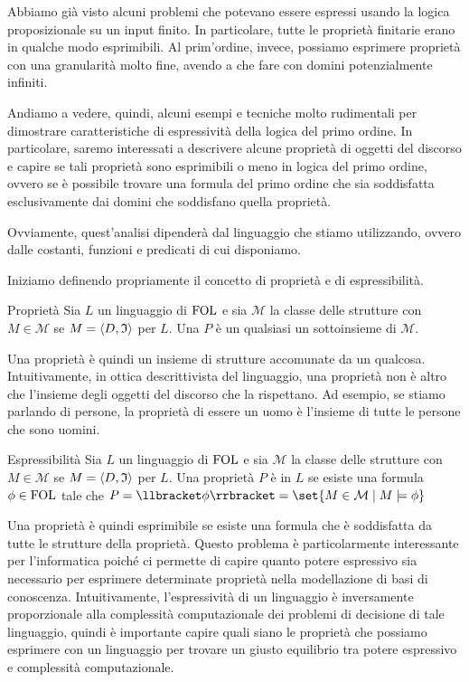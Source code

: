 Abbiamo già visto alcuni problemi che potevano essere espressi usando la logica proposizionale su un input finito. In particolare, tutte le proprietà finitarie erano in qualche modo esprimibili. Al prim'ordine, invece, possiamo esprimere proprietà con una granularità molto fine, avendo a che fare con domini potenzialmente infiniti. 

Andiamo a vedere, quindi, alcuni esempi e tecniche molto rudimentali per dimostrare caratteristiche di espressività della logica del primo ordine. In particolare, saremo interessati a descrivere alcune proprietà di oggetti del discorso e capire se tali proprietà sono esprimibili o meno in logica del primo ordine, ovvero se è possibile trovare una formula del primo ordine che sia soddisfatta esclusivamente dai domini che soddisfano quella proprietà.

Ovviamente, quest'analisi dipenderà dal linguaggio che stiamo utilizzando, ovvero dalle costanti, funzioni e predicati di cui disponiamo. 

Iniziamo definendo propriamente il concetto di proprietà e di espressibilità.

\begin{definition}{Proprietà}
  Sia \(L\) un linguaggio di \(\FOL\) e sia \(\mathcal{M}\) la classe delle strutture con \(M \in \mathcal{M}\) se \(M = \langle D,\mathfrak{I}\rangle\) per \(L\). Una  \(P\) è un qualsiasi un sottoinsieme di \(\mathcal{M}\).
\end{definition}

Una proprietà è quindi un insieme di strutture accomunate da un qualcosa.
Intuitivamente, in ottica descrittivista del linguaggio, una proprietà non è altro che l'insieme degli oggetti del discorso che la rispettano. Ad esempio, se stiamo parlando di persone, la proprietà di essere un uomo è l'insieme di tutte le persone che sono uomini.

\begin{definition}{Espressibilità}
  Sia \(L\) un linguaggio di \(\FOL\) e sia \(\mathcal{M}\) la classe delle strutture con \(M \in \mathcal{M}\) se \(M = \langle D,\mathfrak{I}\rangle\) per \(L\). Una proprietà \(P\) è  in \(L\) se esiste una formula \(\phi \in \FOL\) tale che \(P=\den{\phi}=\set{M \in \mathcal{M} \mid M \models \phi}\)
\end{definition}

Una proprietà è quindi esprimibile se esiste una formula che è soddisfatta da tutte le strutture della proprietà.
Questo problema è particolarmente interessante per l'informatica poiché ci permette di capire quanto potere espressivo sia necessario per esprimere determinate proprietà nella modellazione di basi di conoscenza. Intuitivamente, l'espressività di un linguaggio è inversamente proporzionale alla complessità computazionale dei problemi di decisione di tale linguaggio, quindi è importante capire quali siano le proprietà che possiamo esprimere con un linguaggio per trovare un giusto equilibrio tra potere espressivo e complessità computazionale.

